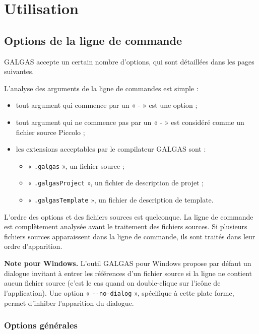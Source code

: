 
\chapter{Utilisation}


\section{Options de la ligne de commande}

GALGAS accepte un certain nombre d’options, qui sont détaillées dans les pages suivantes.

L’analyse des arguments de la ligne de commandes est simple :
\begin{itemize}
  \item tout argument qui commence par un « - » est une option ;
  \item tout argument qui ne commence pas par un « - » est considéré comme un fichier source Piccolo ;
  \item les extensions acceptables par le compilateur GALGAS sont :
  \begin{itemize}
    \item « \texttt{.galgas} », un fichier source ;
    \item « \texttt{.galgasProject} », un fichier de description de projet ;
    \item « \texttt{.galgasTemplate} », un fichier de description de template.
  \end{itemize}
\end{itemize}

L’ordre des options et des fichiers sources est quelconque. La ligne de commande est complètement analysée avant le traitement des fichiers sources. Si plusieurs fichiers sources apparaissent dans la ligne de commande, ils sont traités dans leur ordre d’apparition.

{\bf Note pour Windows.} L’outil GALGAS pour Windows propose par défaut un dialogue invitant à entrer les références d’un fichier source si la ligne ne contient aucun fichier source (c’est le cas quand on double-clique sur l’icône de l’application). Une option « \texttt{-{-}no-dialog} », spécifique à cette plate forme, permet d'inhiber l’apparition du dialogue.

\subsection{Options générales}

